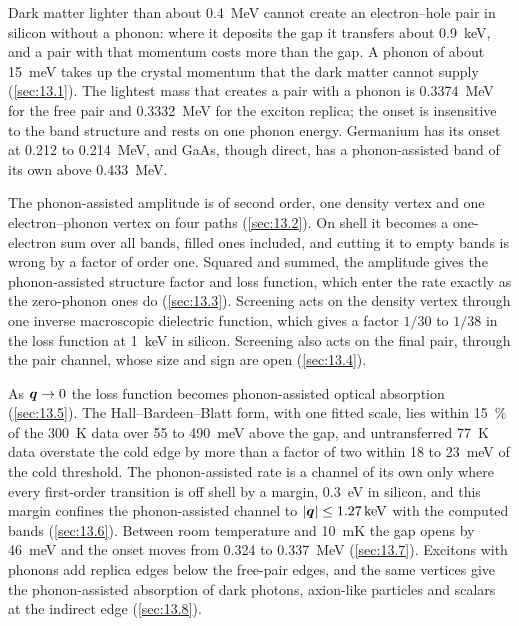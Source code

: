 Dark matter lighter than about \SI{0.4}{MeV} cannot create an electron--hole pair in silicon without a phonon: where it deposits the gap it transfers about \SI{0.9}{keV}, and a pair with that momentum costs more than the gap. A phonon of about \SI{15}{meV} takes up the crystal momentum that the dark matter cannot supply (\cref{sec:13.1}). The lightest mass that creates a pair with a phonon is \SI{0.3374}{MeV} for the free pair and \SI{0.3332}{MeV} for the exciton replica; the onset is insensitive to the band structure and rests on one phonon energy. Germanium has its onset at 0.212 to \SI{0.214}{MeV}, and GaAs, though direct, has a phonon-assisted band of its own above \SI{0.433}{MeV}.

The phonon-assisted amplitude is of second order, one density vertex and one electron--phonon vertex on four paths (\cref{sec:13.2}). On shell it becomes a one-electron sum over all bands, filled ones included, and cutting it to empty bands is wrong by a factor of order one. Squared and summed, the amplitude gives the phonon-assisted structure factor and loss function, which enter the rate exactly as the zero-phonon ones do (\cref{sec:13.3}). Screening acts on the density vertex through one inverse macroscopic dielectric function, which gives a factor $1/30$ to $1/38$ in the loss function at \SI{1}{keV} in silicon. Screening also acts on the final pair, through the pair channel, whose size and sign are open (\cref{sec:13.4}).

As $\bm{q} \to 0$ the loss function becomes phonon-assisted optical absorption (\cref{sec:13.5}). The Hall--Bardeen--Blatt form, with one fitted scale, lies within \SI{15}{\percent} of the \SI{300}{K} data over 55 to \SI{490}{meV} above the gap, and untransferred \SI{77}{K} data overstate the cold edge by more than a factor of two within 18 to \SI{23}{meV} of the cold threshold. The phonon-assisted rate is a channel of its own only where every first-order transition is off shell by a margin, \SI{0.3}{eV} in silicon, and this margin confines the phonon-assisted channel to $|\bm{q}| \le \SI{1.27}{keV}$ with the computed bands (\cref{sec:13.6}). Between room temperature and \SI{10}{mK} the gap opens by \SI{46}{meV} and the onset moves from 0.324 to \SI{0.337}{MeV} (\cref{sec:13.7}). Excitons with phonons add replica edges below the free-pair edges, and the same vertices give the phonon-assisted absorption of dark photons, axion-like particles and scalars at the indirect edge (\cref{sec:13.8}).

